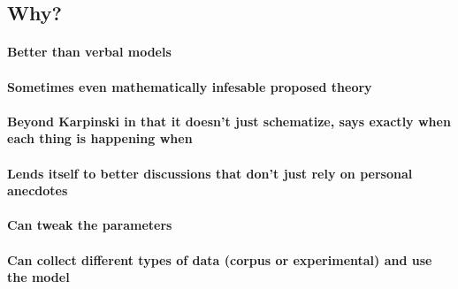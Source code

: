 \documentclass[]{book}
\let\oldparagraph\paragraph
\renewcommand{\paragraph}[1]{\oldparagraph{#1}\mbox{}}
\theoremstyle{definition}
\theoremstyle{definition}
\theoremstyle{definition}
\theoremstyle{remark}
\begin{document}
\hypertarget{why-2}{%
\subsection{Why?}\label{why-2}}

\hypertarget{better-than-verbal-models}{%
\paragraph{Better than verbal models}\label{better-than-verbal-models}}

\hypertarget{sometimes-even-mathematically-infesable-proposed-theory}{%
\paragraph{Sometimes even mathematically infesable proposed
theory}\label{sometimes-even-mathematically-infesable-proposed-theory}}

\hypertarget{beyond-karpinski-in-that-it-doesnt-just-schematize-says-exactly-when-each-thing-is-happening-when}{%
\paragraph{Beyond Karpinski in that it doesn't just schematize, says
exactly when each thing is happening
when}\label{beyond-karpinski-in-that-it-doesnt-just-schematize-says-exactly-when-each-thing-is-happening-when}}

\hypertarget{lends-itself-to-better-discussions-that-dont-just-rely-on-personal-anecdotes}{%
\paragraph{Lends itself to better discussions that don't just rely on
personal
anecdotes}\label{lends-itself-to-better-discussions-that-dont-just-rely-on-personal-anecdotes}}

\hypertarget{can-tweak-the-parameters}{%
\paragraph{Can tweak the parameters}\label{can-tweak-the-parameters}}

\hypertarget{can-collect-different-types-of-data-corpus-or-experimental-and-use-the-model}{%
\paragraph{Can collect different types of data (corpus or experimental)
and use the
model}\label{can-collect-different-types-of-data-corpus-or-experimental-and-use-the-model}}
\end{document}
